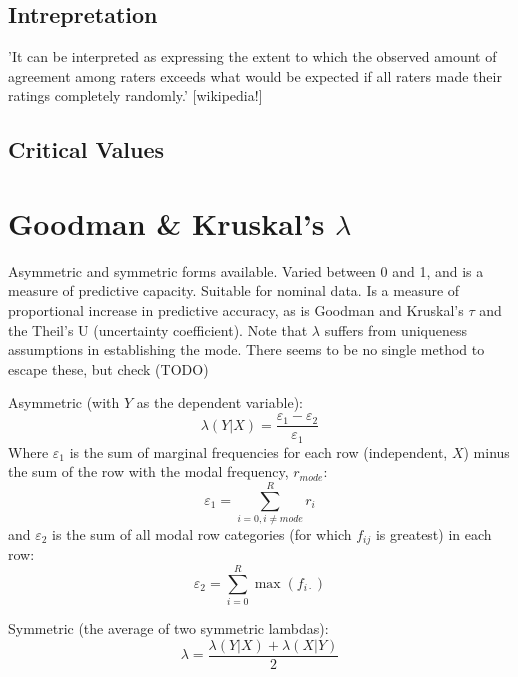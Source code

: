 \documentclass[11pt]{article}
\begin{document}
\subsection{Intrepretation}
'It can be interpreted as expressing the extent to which the observed amount of agreement among raters exceeds what would be expected if all raters made their ratings completely randomly.' [wikipedia!]

\subsection{Critical Values}



\section{Goodman \& Kruskal's $\lambda$}
Asymmetric and symmetric forms available.  Varied between 0 and 1, and is a measure of predictive capacity.  Suitable for nominal data.  Is a measure of proportional increase in predictive accuracy, as is Goodman and Kruskal's $\tau$ and the Theil's U (uncertainty coefficient).  Note that $\lambda$ suffers from uniqueness assumptions in establishing the mode.  There seems to be no single method to escape these, but check (TODO)

Asymmetric (with $Y$ as the dependent variable):
$$
\lambda(Y|X) = \frac{ \varepsilon_1 - \varepsilon_2 }{ \varepsilon_1 }
$$
Where $\varepsilon_1$ is the sum of marginal frequencies for each row (independent, $X$) minus the sum of the row with the modal frequency, $r_{mode}$:
$$
\varepsilon_1 = \sum_{i=0, i \neq mode}^{R}{ r_i }
$$
and $\varepsilon_2$ is the sum of all modal row categories (for which $f_{ij}$ is greatest) in each row:
$$
\varepsilon_2 = \sum_{i=0}^{R}{ \max( f_{i\cdot} ) }
$$

Symmetric (the average of two symmetric lambdas):
$$
\lambda = \frac{ \lambda(Y|X) + \lambda(X|Y) }{ 2 }
$$
\end{document}
